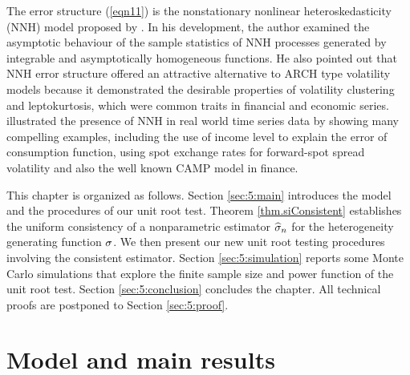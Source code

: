 The error structure (\ref {eqn11}) is the nonstationary nonlinear heteroskedasticity (NNH) model proposed by \cite{park2002}. In his development, the author examined the asymptotic behaviour of the sample statistics of NNH processes generated by integrable and asymptotically homogeneous functions. He also pointed out that NNH error structure offered an attractive alternative to ARCH type volatility models because it demonstrated the desirable properties of volatility clustering and leptokurtosis, which were common traits in financial and economic series. \cite{chungpark2007} illustrated the presence of NNH in real world time series data by showing many compelling examples, including the use of income level to explain
the error of consumption function, using spot exchange rates for
forward-spot spread volatility and also the well known CAMP model in
finance.

This chapter is organized as follows. Section \ref{sec:5:main} introduces the model and the procedures of our unit root test. Theorem \ref{thm.siConsistent} establishes the uniform consistency of a nonparametric estimator $\widehat{\sigma}_n$ for the heterogeneity generating function $\sigma$. We then present our new unit root testing procedures involving the consistent estimator. Section \ref{sec:5:simulation} reports some Monte Carlo simulations that explore the finite sample size and power function of the unit root test. Section \ref{sec:5:conclusion} concludes the chapter. All technical proofs are postponed to Section \ref{sec:5:proof}.

\section{Model and main results} 

